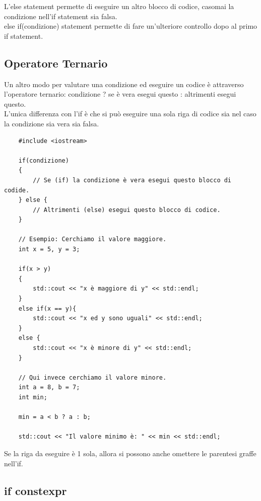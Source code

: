 \textsf{\small L'else statement permette di eseguire un altro blocco di codice, casomai la condizione nell'if statement sia falsa.} \\

\textsf{\small else if(condizione) statement permette di fare un'ulteriore controllo dopo al primo if statement. } \\

\subsection{Operatore Ternario}

\textsf{\small Un altro modo per valutare una condizione ed eseguire un codice è attraverso l'operatore ternario: condizione ? se è vera esegui questo : altrimenti esegui questo.} \\

\textsf{\small L'unica differenza con l'if è che si può eseguire una sola riga di codice sia nel caso la condizione sia vera sia falsa.} \\

\begin{lstlisting}
	#include <iostream>
	
	if(condizione)
	{
		// Se (if) la condizione è vera esegui questo blocco di codide.
	} else {
		// Altrimenti (else) esegui questo blocco di codice.
	}

	// Esempio: Cerchiamo il valore maggiore.
	int x = 5, y = 3;
	
	if(x > y)
	{
		std::cout << "x è maggiore di y" << std::endl;
	} 
	else if(x == y){
		std::cout << "x ed y sono uguali" << std::endl;
	}
	else {
		std::cout << "x è minore di y" << std::endl;
	}

	// Qui invece cerchiamo il valore minore.
	int a = 8, b = 7;
	int min;
	
	min = a < b ? a : b;
	
	std::cout << "Il valore minimo è: " << min << std::endl;
\end{lstlisting}

\textsf{\small Se la riga da eseguire è 1 sola, allora si possono anche omettere le parentesi graffe nell'if.} \\

\subsection{if constexpr}


